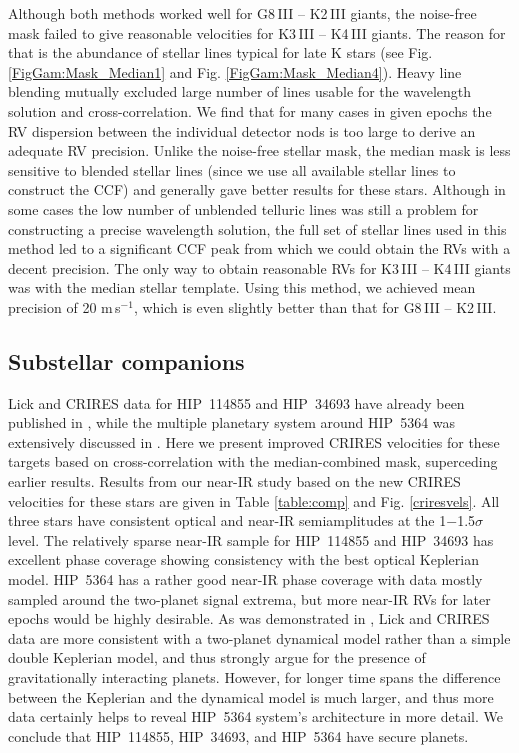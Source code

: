 \documentclass{aa}
\begin{document}
Although both methods worked well for G8\,III -- K2\,III giants, the noise-free mask failed to give reasonable 
velocities for K3\,III -- K4\,III giants. The reason for that is the abundance of stellar lines typical for late K stars
 (see Fig. \ref{FigGam:Mask_Median1} and Fig. \ref{FigGam:Mask_Median4}).
Heavy line blending mutually excluded large number of lines usable for the wavelength solution and cross-correlation.
We find that for many cases in given epochs the RV dispersion between the individual detector 
nods is too large to derive an adequate RV precision.
Unlike the noise-free stellar mask, the median mask is less sensitive to blended stellar lines 
(since we use all available stellar lines to construct the CCF) and generally gave better results for these stars. 
Although in some cases the low number of unblended telluric lines was still a problem 
for constructing a precise wavelength solution, the full set of stellar lines used 
in this method led to a significant CCF peak from which we could obtain the RVs with a decent precision.
 The only way to obtain reasonable RVs for K3\,III -- K4\,III giants was with the median stellar template. 
Using this method, we achieved mean precision of 20 m\,s$^{-1}$, which is even slightly better than that for G8\,III -- K2\,III.



\subsection{Substellar companions}

Lick and CRIRES data for HIP~114855 and HIP~34693 have already been published in \citet{Mitchell2013}, while 
the multiple planetary system around HIP~5364 was extensively discussed in \citet{Trifonov2014}. 
Here we present improved CRIRES velocities for these targets 
based on cross-correlation with the median-combined mask, superceding  earlier results. 
Results from our near-IR study based on the new CRIRES velocities 
for these stars are given in Table \ref{table:comp} and Fig. \ref{criresvels}.
All three stars have consistent optical and near-IR semiamplitudes at the 1$-$1.5$\sigma$ level. 
 The relatively sparse near-IR sample
for HIP~114855 and HIP~34693 has excellent phase coverage showing consistency with the best optical Keplerian model.
HIP~5364 has a rather good near-IR phase coverage with data mostly sampled around the two-planet signal
extrema, but more near-IR RVs for later epochs would be highly desirable. 
As was demonstrated in \citet{Trifonov2014}, Lick and CRIRES data are  
more consistent with a two-planet dynamical model rather than a simple double Keplerian model, and thus strongly argue
for the presence of gravitationally interacting planets. 
However, for longer time spans the difference between the Keplerian and the dynamical model is 
much larger, and thus more data  certainly helps to reveal HIP~5364 system's architecture in more detail.
We conclude that HIP~114855, HIP~34693, and HIP~5364 have secure planets.
\end{document}
